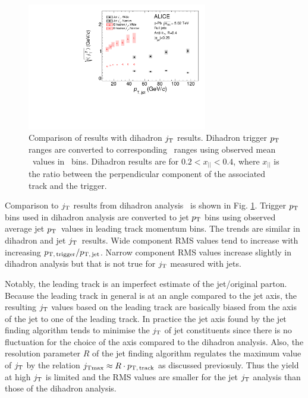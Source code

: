 \begin{figure}[t]
\centering
\includegraphics[width=0.7\textwidth]{newfigures/RMSWithSystematics_DihadronJetPt}

\caption{Comparison of results with dihadron $j_{\rm T}$ results. Dihadron trigger $p_{\rm T}$ ranges are converted to corresponding \ptjet\ ranges  using observed mean \ptjet\ values in \pttrigger\ bins. Dihadron results are for $0.2 < x_{||} < 0.4$, where $x_{||}$ is the ratio between the perpendicular component of the associated track and the trigger. }
\label{fig:DihadronComparison}
\end{figure}

Comparison to $j_{\rm T}$ results from dihadron analysis~\cite{ALICEjt} is shown in Fig. \ref{fig:DihadronComparison}. Trigger $p_{\rm T}$ bins used in dihadron analysis are converted to jet $p_{\rm T}$ bins using observed average jet $p_{\rm T}$ values in leading track momentum bins. %
The trends are similar in dihadron and jet $j_{\rm T}$ results. Wide component RMS values tend to increase with increasing $p_\mathrm{T,\,trigger}/p_\mathrm{T,\,jet}$. Narrow component RMS values increase slightly in dihadron analysis but that is not true for $j_{\rm T}$ measured with jets. 


  
Notably, the leading track is an imperfect estimate of the jet/original parton. Because the leading track in general is at an angle compared to the jet axis, the resulting $j_{\rm T}$ values based on the leading track are basically biased from the axis of the jet to one of the leading track. In practice the jet axis found by the jet finding algorithm tends to minimise the $j_{\rm T}$ of jet constituents since there is no fluctuation for the choice of the axis compared to the dihadron analysis. Also, the resolution parameter $R$ of the jet finding algorithm regulates the maximum value of $j_{\rm T}$ by the relation $j_{\rm Tmax} \approx R \cdot p_\mathrm{T,\,track}$ as discussed previosuly. Thus the yield at high $j_{\rm T}$ is limited and the RMS values are smaller for the jet $j_{\rm T}$ analysis than those of the dihadron analysis. 

